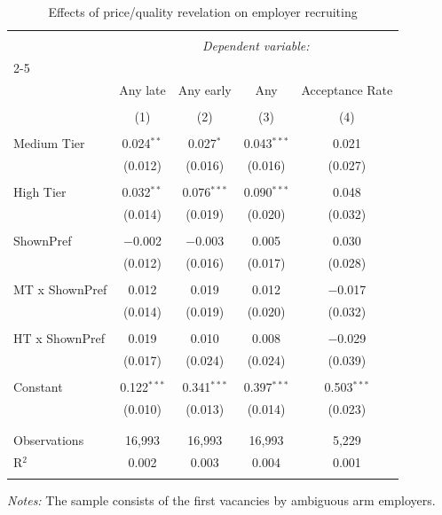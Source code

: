 
\begin{table}[!htbp] \centering 
  \caption{Effects of price/quality revelation on employer recruiting} 
  \label{tab:invites} 
\small 
\begin{tabular}{@{\extracolsep{5pt}}lcccc} 
\\[-1.8ex]\hline 
\hline \\[-1.8ex] 
 & \multicolumn{4}{c}{\textit{Dependent variable:}} \\ 
\cline{2-5} 
\\[-1.8ex] & Any late & Any early & Any & Acceptance Rate \\ 
\\[-1.8ex] & (1) & (2) & (3) & (4)\\ 
\hline \\[-1.8ex] 
 Medium Tier & 0.024$^{**}$ & 0.027$^{*}$ & 0.043$^{***}$ & 0.021 \\ 
  & (0.012) & (0.016) & (0.016) & (0.027) \\ 
  & & & & \\ 
 High Tier & 0.032$^{**}$ & 0.076$^{***}$ & 0.090$^{***}$ & 0.048 \\ 
  & (0.014) & (0.019) & (0.020) & (0.032) \\ 
  & & & & \\ 
 ShownPref & $-$0.002 & $-$0.003 & 0.005 & 0.030 \\ 
  & (0.012) & (0.016) & (0.017) & (0.028) \\ 
  & & & & \\ 
 MT x ShownPref & 0.012 & 0.019 & 0.012 & $-$0.017 \\ 
  & (0.014) & (0.019) & (0.020) & (0.032) \\ 
  & & & & \\ 
 HT x ShownPref & 0.019 & 0.010 & 0.008 & $-$0.029 \\ 
  & (0.017) & (0.024) & (0.024) & (0.039) \\ 
  & & & & \\ 
 Constant & 0.122$^{***}$ & 0.341$^{***}$ & 0.397$^{***}$ & 0.503$^{***}$ \\ 
  & (0.010) & (0.013) & (0.014) & (0.023) \\ 
  & & & & \\ 
\hline \\[-1.8ex] 
Observations & 16,993 & 16,993 & 16,993 & 5,229 \\ 
R$^{2}$ & 0.002 & 0.003 & 0.004 & 0.001 \\ 
\hline 
\hline \\[-1.8ex] 
\end{tabular}
\begin{minipage}{0.9\textwidth} 
 \emph{Notes:} The sample consists of the first vacancies by ambiguous arm employers. \starlanguage
 \end{minipage}
\end{table}
